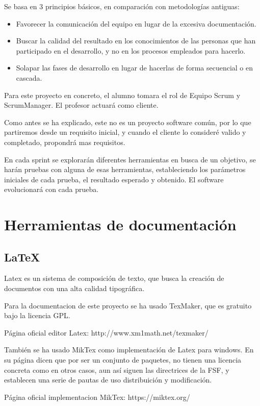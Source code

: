 Se basa en 3 principios básicos, en comparación con metodologías antiguas:
\begin{itemize}
	\item Favorecer la comunicación del equipo en lugar de la excesiva documentación.
	\item Buscar la calidad del resultado en los conocimientos de las personas que han participado en el desarrollo, y no en los procesos empleados para hacerlo.
	\item Solapar las fases de desarrollo en lugar de hacerlas de forma secuencial o en cascada.
\end{itemize}

Para este proyecto en concreto, el alumno tomara el rol de Equipo Scrum y ScrumManager. El profesor actuará como cliente.

Como antes se ha explicado, este no es un proyecto software común, por lo que partiremos desde un requisito inicial, y cuando el cliente lo consideré valido y completado, propondrá mas requisitos.

En cada sprint se explorarán diferentes herramientas en busca de un objetivo, se harán pruebas con alguna de esas herramientas, estableciendo los parámetros iniciales de cada prueba, el resultado esperado y obtenido. El software evolucionará con cada prueba.

\section{Herramientas de documentación}

\subsection{LaTeX}

Latex es un sistema de composición de texto, que busca la creación de documentos con una alta calidad tipográfica.

Para la documentacion de este proyecto se ha usado TexMaker, que es gratuito bajo la licencia GPL.

Página oficial editor Latex: http://www.xm1math.net/texmaker/

También se ha usado MikTex como implementación de Latex para windows. En su página dicen que por ser un conjunto de paquetes, no tienen una licencia concreta como en otros casos, aun así siguen las directrices de la FSF, y establecen una serie de pautas de uso distribuición y modificación.

Página oficial implementacion MikTex: https://miktex.org/

